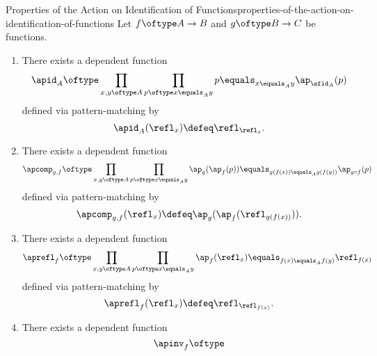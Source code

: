 \begin{proposition}{Properties of the Action on Identification of Functions}{properties-of-the-action-on-identification-of-functions}%
    Let $f\oftype A\to B$ and $g\oftype B\to C$ be functions.
    \begin{enumerate}
        \item\label{properties-of-the-action-on-identification-of-functions-interaction-with-identities}There exists a dependent function
            \[
                \apid_{A}%
                \oftype%
                \prod_{x,y\oftype A}%
                \prod_{p\oftype x\equals_{A}y}%
                p\equals_{x\equals_{A}y}\ap_{\sfid_{A}}(p)%
            \]%
            defined via pattern-matching by
            \[
                \apid_{A}(\refl_{x})%
                \defeq%
                \refl_{\refl_{x}}.%
            \]%
        \item\label{properties-of-the-action-on-identification-of-functions-interaction-with-composition}There exists a dependent function
            \[
                \apcomp_{g,f}%
                \oftype%
                \prod_{x,y\oftype A}%
                \prod_{p\oftype x\equals_{A}y}%
                \ap_{g}(\ap_{f}(p))%
                \equals_{g(f(x))\equals_{A}g(f(y))}%
                \ap_{g\circ f}(p)%
            \]%
            defined via pattern-matching by
            \[
                \apcomp_{g,f}(\refl_{x})%
                \defeq%
                \ap_{g}(\ap_{f}(\refl_{g(f(x))})).%
            \]%
        \item\label{properties-of-the-action-on-identification-of-functions-interaction-with-reflexivity}There exists a dependent function
            \[
                \aprefl_{f}%
                \oftype%
                \prod_{x,y\oftype A}%
                \prod_{p\oftype x\equals_{A}y}%
                \ap_{f}(\refl_{x})%
                \equals_{f(x)\equals_{A}f(y)}%
                \refl_{f(x)}%
            \]%
            defined via pattern-matching by
            \[
                \aprefl_{f}(\refl_{x})%
                \defeq%
                \refl_{\refl_{f(x)}}.%
            \]%
        \item\label{properties-of-the-action-on-identification-of-functions-interaction-with-inversion}There exists a dependent function
            \[
                \apinv_{f}%
                \oftype%
\]
\end{enumerate}
\end{proposition}
